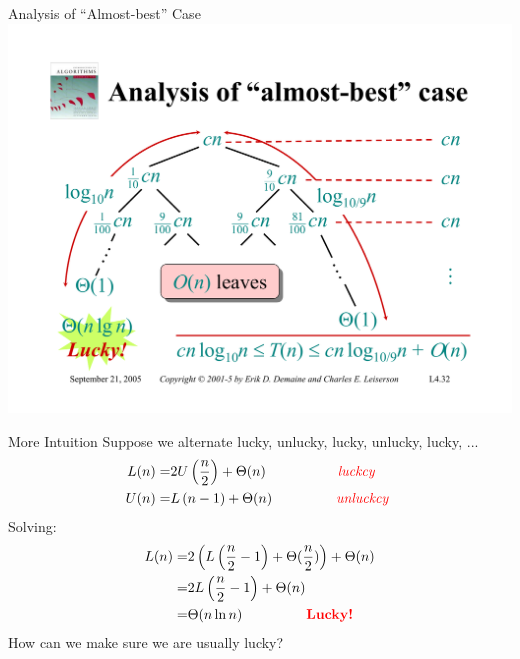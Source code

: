 \documentclass{beamer}
\begin{document}
\begin{frame}{Analysis of ``Almost-best'' Case}
    \centering
    \includegraphics[width=\textwidth, trim={1.00cm 1.50cm 1.00cm 4.25cm}, clip]{pages/lec4_32}
\end{frame}

\begin{frame}{More Intuition}
    Suppose we alternate lucky, unlucky, lucky, unlucky, lucky, ...
    \begin{equation*}
        \begin{split}
            L(n) =& 2U\left(\frac{n}{2}\right) + \Theta(n) \text{\hspace{17mm} \textcolor{red}{\textit{luckcy}} } \\
            U(n) =& L\left(n - 1\right) + \Theta(n) \text{\hspace{15mm} \textcolor{red}{\textit{unluckcy}} } \\
        \end{split}
    \end{equation*}
    Solving:
    \begin{equation*}
        \begin{split}
            L(n) =& 2\left(L\left(\frac{n}{2} - 1 \right) + \Theta(\frac{n}{2})\right) + \Theta(n) \\
                 =& 2L\left(\frac{n}{2} - 1 \right) + \Theta(n) \\
                 =& \Theta(n \ln n) \text{\hspace{15mm} \textbf{\textcolor{red}{Lucky!}}}
        \end{split}
    \end{equation*}
    How can we make sure we are usually lucky?
\end{frame}
\end{document}
